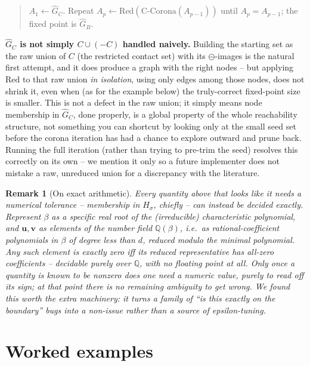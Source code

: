 \documentclass[11pt]{article}
\newtheorem{remark}{Remark}
\begin{document}
\begin{quote}
$A_1 \leftarrow \hat G_C$. Repeat $A_{p} \leftarrow \mathrm{Red}(\mathrm{C\text{-}Corona}(A_{p-1}))$ until $A_p = A_{p-1}$; the fixed point is $\hat G_B$.
\end{quote}

\begin{nuance}\label{nuance:2826}
\textbf{$\hat G_C$ is not simply $C\cup(-C)$ handled naively.} Building the
starting set as the raw union of $C$ (the restricted contact set) with its
$\ominus$-images is the natural first attempt, and it does produce a graph
with the right nodes -- but applying $\mathrm{Red}$ to that raw union \emph{in
isolation}, using only edges among those nodes, does not shrink it, even when
(as for the example below) the truly-correct fixed-point size is smaller.
This is not a defect in the raw union; it simply means node membership in
$\hat G_C$, done properly, is a global property of the whole reachability
structure, not something you can shortcut by looking only at the small
seed set before the corona iteration has had a chance to explore outward and
prune back. Running the full iteration (rather than trying to pre-trim the
seed) resolves this correctly on its own -- we mention it only so a future
implementer does not mistake a raw, unreduced union for a discrepancy with
the literature.
\end{nuance}

\begin{remark}[On exact arithmetic]\label{rem:exact}
Every quantity above that looks like it needs a numerical tolerance --
membership in $H_\sigma$, chiefly -- can instead be decided exactly. Represent
$\beta$ as a specific real root of the (irreducible) characteristic
polynomial, and $\mathbf{u},\mathbf{v}$ as elements of the number field
$\mathbb{Q}(\beta)$, i.e.\ as rational-coefficient polynomials in $\beta$ of
degree less than $d$, reduced modulo the minimal polynomial. Any such element
is exactly zero iff its reduced representative has all-zero coefficients --
decidable purely over $\mathbb{Q}$, with no floating point at all. Only once a
quantity is known to be nonzero does one need a numeric value, purely to read
off its sign; at that point there is no remaining ambiguity to get wrong. We
found this worth the extra machinery: it turns a family of ``is this exactly
on the boundary'' bugs into a non-issue rather than a source of
epsilon-tuning.
\end{remark}

\section{Worked examples}\label{sec:examples}
\end{document}
